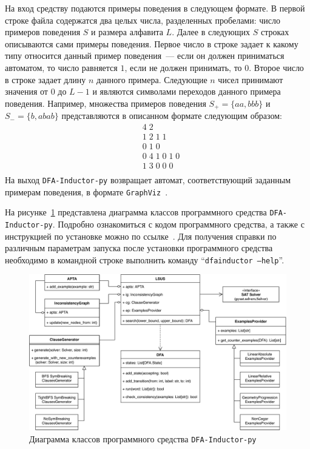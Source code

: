 На вход средству подаются примеры поведения в следующем формате.
В первой строке файла содержатся два целых числа, разделенных пробелами: число примеров поведения $S$ и размера алфавита $L$.
Далее в следующих $S$ строках описываются сами примеры поведения.
Первое число в строке задает к какому типу относится данный пример поведения~--- если он должен приниматься автоматом, то число равняется $1$, если не должен принимать, то $0$.
Второе число в строке задает длину $n$ данного примера.
Следующие $n$ чисел принимают значения от $0$ до $L - 1$ и являются символами переходов данного примера поведения.
Например, множества примеров поведения $S_{+}=\{aa,bbb\}$ и $S_{-}=\{b,abab\}$ представляются в описанном формате следующим образом:
\begin{align*}
  &4\;2      \\
  &1\;2\;1\;1\\
  &0\;1\;0\\
  &0\;4\;1\;0\;1\;0\\
  &1\;3\;0\;0\;0\\ 
\end{align*}
На выход \texttt{DFA-Inductor-py} возвращает автомат, соответствующий заданным примерам поведения, в формате \texttt{GraphViz}~\cite{graphviz}.

На рисунке~\ref{img:uml} представлена диаграмма классов программного средства \texttt{DFA-Inductor-py}.
Подробно ознакомиться с кодом программного средства, а также с инструкцией по установке можно по ссылке~\cite{dfa-inductor-py}.
Для получения справки по различным параметрам запуска после установки программного средства необходимо в командной строке выполнить команду ``\texttt{dfainductor --help}''.

\begin{figure}[ht]
  \centering
  \includegraphics[width=\textwidth]{img/uml.pdf}
  \caption{Диаграмма классов программного средства \texttt{DFA-Inductor-py}}
  \label{img:uml}
\end{figure}


